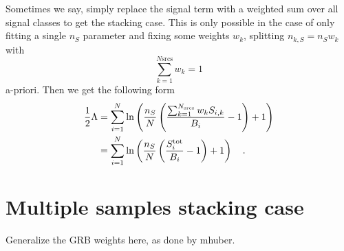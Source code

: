 Sometimes we say, simply replace the signal term with a weighted sum over all signal classes to get the stacking case.
This is only possible in the case of only fitting a single $n_S$ parameter and fixing some weights $w_k$, splitting $n_{k,S} = n_S w_k$ with
\begin{equation}
  \sum_{k=1}^{N\text{srcs}} w_k = 1
\end{equation}
a-priori.
Then we get the following form
\begin{align}
  \frac{1}{2}\Lambda
  &= \sum_{i=1}^N\ln\left(
      \frac{n_S}{N}\left(
        \frac{\sum_{k=1}^{N_\text{srcs}}w_k S_{i,k}}{B_i} - 1
      \right) + 1
    \right)  \\
  &= \sum_{i=1}^N\ln\left(
      \frac{n_S}{N}\left(\frac{S_i^\text{tot}}{B_i} - 1\right) + 1
    \right)
  \quad\text{.}
\end{align}

\section{Multiple samples stacking case}
Generalize the GRB weights here, as done by mhuber.

\listofnotes
